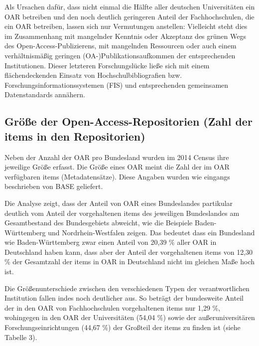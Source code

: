 \documentclass[a4paper,
fontsize=11pt,
oneside,
numbers=noperiodatend,
parskip=half-,
bibliography=totoc,
final
]{scrartcl}
\begin{document}
Als Ursachen dafür, dass nicht einmal die Hälfte aller deutschen
Universitäten ein OAR betreiben und den noch deutlich geringeren Anteil
der Fachhochschulen, die ein OAR betreiben, lassen sich nur Vermutungen
anstellen: Vielleicht steht dies im Zusammenhang mit mangelnder Kenntnis
oder Akzeptanz des grünen Wegs des Open-Access-Publizierens, mit
mangelnden Ressourcen oder auch einem verhältnismäßig geringen
(OA-)Publikationsaufkommen der entsprechenden Institutionen. Dieser
letzteren Forschungslücke ließe sich mit einem flächendeckenden Einsatz
von Hochschulbibliografien bzw. Forschungsinformationssystemen (FIS) und
entsprechenden gemeinsamen Datenstandards annähern.

\subsection*{Größe der Open-Access-Repositorien (Zahl der items in den
Repositorien)}\label{gruxf6uxdfe-der-open-access-repositorien-zahl-der-items-in-den-repositorien}

Neben der Anzahl der OAR pro Bundesland wurden im 2014 Census ihre
jeweilige Größe erfasst. Die Größe eines OAR meint die Zahl der im OAR
verfügbaren items (Metadatensätze). Diese Angaben wurden wie eingangs
beschrieben von BASE geliefert.

Die Analyse zeigt, dass der Anteil von OAR eines Bundeslandes partikular
deutlich vom Anteil der vorgehaltenen items des jeweiligen Bundeslandes
am Gesamtbestand des Bundesgebiets abweicht, wie die Beispiele
Baden-Württemberg und Nordrhein-Westfalen zeigen. Das bedeutet dass ein
Bundesland wie Baden-Württemberg zwar einen Anteil von 20,39 \% aller
OAR in Deutschland haben kann, dass aber der Anteil der vorgehaltenen
items von 12,30 \% der Gesamtzahl der items in OAR in Deutschland nicht
im gleichen Maße hoch ist.

Die Größenunterschiede zwischen den verschiedenen Typen der
verantwortlichen Institution fallen indes noch deutlicher aus. So
beträgt der bundesweite Anteil der in den OAR von Fachhochschulen
vorgehaltenen items nur 1,29 \%, wohingegen in den OAR der Universitäten
(54,04 \%) sowie der außeruniversitären Forschungseinrichtungen (44,67 \%)
der Großteil der items zu finden ist (siehe Tabelle 3).
\end{document}
